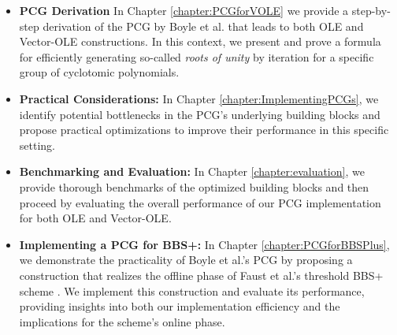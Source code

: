 \begin{itemize}
\item \textbf{PCG Derivation} In Chapter \ref{chapter:PCGforVOLE} we provide a step-by-step derivation of the PCG by Boyle et al. that leads to both OLE and Vector-OLE constructions. In this context, we present and prove a formula for efficiently generating so-called \textit{roots of unity} by iteration for a specific group of cyclotomic polynomials.
\item \textbf{Practical Considerations:} In Chapter \ref{chapter:ImplementingPCGs}, we identify potential bottlenecks in the PCG's underlying building blocks and propose practical optimizations to improve their performance in this specific setting.
\item \textbf{Benchmarking and Evaluation:} In Chapter \ref{chapter:evaluation}, we provide thorough benchmarks of the optimized building blocks and then proceed by evaluating the overall performance of our PCG implementation for both OLE and Vector-OLE.
\item \textbf{Implementing a PCG for BBS+:} In Chapter \ref{chapter:PCGforBBSPlus}, we demonstrate the practicality of Boyle et al.'s PCG by proposing a construction that realizes the offline phase of Faust et al.'s threshold BBS+ scheme \cite{faust2023non}. We implement this construction and evaluate its performance, providing insights into both our implementation efficiency and the implications for the scheme's online phase.
\end{itemize}

